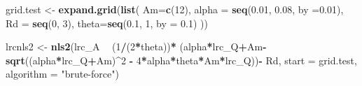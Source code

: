 \documentclass[
]{krantz}
\makeatletter
\newenvironment{Shaded}{\begin{snugshade}}{\end{snugshade}}
\newcommand{\DataTypeTok}[1]{\textcolor[rgb]{0.13,0.29,0.53}{#1}}
\newcommand{\DecValTok}[1]{\textcolor[rgb]{0.00,0.00,0.81}{#1}}
\newcommand{\FloatTok}[1]{\textcolor[rgb]{0.00,0.00,0.81}{#1}}
\newcommand{\KeywordTok}[1]{\textcolor[rgb]{0.13,0.29,0.53}{\textbf{#1}}}
\newcommand{\NormalTok}[1]{#1}
\newcommand{\OperatorTok}[1]{\textcolor[rgb]{0.81,0.36,0.00}{\textbf{#1}}}
\newcommand{\StringTok}[1]{\textcolor[rgb]{0.31,0.60,0.02}{#1}}
\newenvironment{kframe}{%
\medskip{}
\setlength{\fboxsep}{.8em}
 \def\at@end@of@kframe{}%
 \ifinner\ifhmode%
  \def\at@end@of@kframe{\end{minipage}}%
  \begin{minipage}{\columnwidth}%
 \fi\fi%
 \def\FrameCommand##1{\hskip\@totalleftmargin \hskip-\fboxsep
 \colorbox{shadecolor}{##1}\hskip-\fboxsep
     \hskip-\linewidth \hskip-\@totalleftmargin \hskip\columnwidth}%
 \MakeFramed {\advance\hsize-\width
   \@totalleftmargin\z@ \linewidth\hsize
   \@setminipage}}%
 {\par\unskip\endMakeFramed%
 \at@end@of@kframe}
\renewenvironment{Shaded}{\begin{kframe}}{\end{kframe}}
\makeatother
\begin{document}
\begin{Shaded}
\begin{Highlighting}[]
\NormalTok{grid.test <-}\StringTok{ }\KeywordTok{expand.grid}\NormalTok{(}\KeywordTok{list}\NormalTok{(}
  \DataTypeTok{Am=}\KeywordTok{c}\NormalTok{(}\DecValTok{12}\NormalTok{),}
  \DataTypeTok{alpha =} \KeywordTok{seq}\NormalTok{(}\FloatTok{0.01}\NormalTok{, }\FloatTok{0.08}\NormalTok{, }\DataTypeTok{by =}\FloatTok{0.01}\NormalTok{),}
  \DataTypeTok{Rd =} \KeywordTok{seq}\NormalTok{(}\DecValTok{0}\NormalTok{, }\DecValTok{3}\NormalTok{),}
  \DataTypeTok{theta=}\KeywordTok{seq}\NormalTok{(}\FloatTok{0.1}\NormalTok{, }\DecValTok{1}\NormalTok{, }\DataTypeTok{by =} \FloatTok{0.1}\NormalTok{)}
\NormalTok{  ))}

\NormalTok{lrcnls2 <-}\StringTok{ }\KeywordTok{nls2}\NormalTok{(lrc_A }\OperatorTok{~}\StringTok{ }
\StringTok{        }\NormalTok{(}\DecValTok{1}\OperatorTok{/}\NormalTok{(}\DecValTok{2}\OperatorTok{*}\NormalTok{theta))}\OperatorTok{*}
\StringTok{        }\NormalTok{(alpha}\OperatorTok{*}\NormalTok{lrc_Q}\OperatorTok{+}\NormalTok{Am}\OperatorTok{-}\KeywordTok{sqrt}\NormalTok{((alpha}\OperatorTok{*}\NormalTok{lrc_Q}\OperatorTok{+}\NormalTok{Am)}\OperatorTok{^}\DecValTok{2} \OperatorTok{-}\StringTok{ }
\StringTok{                               }\DecValTok{4}\OperatorTok{*}\NormalTok{alpha}\OperatorTok{*}\NormalTok{theta}\OperatorTok{*}\NormalTok{Am}\OperatorTok{*}\NormalTok{lrc_Q))}\OperatorTok{-}\StringTok{ }
\StringTok{        }\NormalTok{Rd, }\DataTypeTok{start =}\NormalTok{ grid.test, }\DataTypeTok{algorithm =} \StringTok{"brute-force"}\NormalTok{)}
\end{Highlighting}
\end{Shaded}
\end{document}
